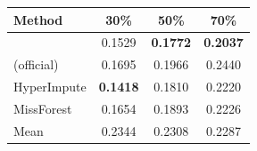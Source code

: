 \begin{tabular}{lccc}
\toprule
Method & 30\% & 50\% & 70\%\\
\midrule
\rmpp{} & 0.1529 & \textbf{0.1772} & \textbf{0.2037}\\
\remasker{} (official) & 0.1695 & 0.1966 & 0.2440\\
HyperImpute & \textbf{0.1418} & 0.1810 & 0.2220\\
MissForest & 0.1654 & 0.1893 & 0.2226\\
Mean & 0.2344 & 0.2308 & 0.2287\\
\bottomrule
\end{tabular}
